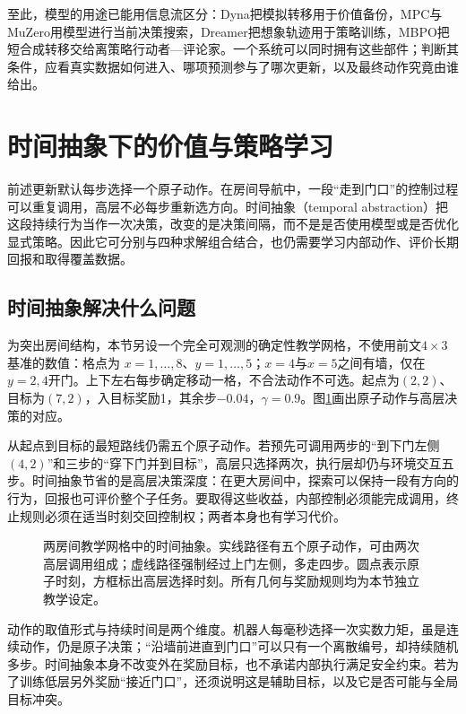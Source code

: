 至此，模型的用途已能用信息流区分：Dyna把模拟转移用于价值备份，MPC与MuZero用模型进行当前决策搜索，Dreamer把想象轨迹用于策略训练，MBPO把短合成转移交给离策略行动者—评论家。一个系统可以同时拥有这些部件；判断其条件，应看真实数据如何进入、哪项预测参与了哪次更新，以及最终动作究竟由谁给出。

\section{时间抽象下的价值与策略学习}
\label{sec:rl-learning-temporal-abstraction}

前述更新默认每步选择一个原子动作。在房间导航中，一段“走到门口”的控制过程可以重复调用，高层不必每步重新选方向。时间抽象（temporal abstraction）把这段持续行为当作一次决策，改变的是决策间隔，而不是是否使用模型或是否优化显式策略。因此它可分别与四种求解组合结合，也仍需要学习内部动作、评价长期回报和取得覆盖数据。

\subsection{时间抽象解决什么问题}
\label{sec:rl-learning-temporal-purpose}

为突出房间结构，本节另设一个完全可观测的确定性教学网格，不使用前文$4\times3$基准的数值：格点为
$x=1,\ldots,8$、$y=1,\ldots,5$；$x=4$与$x=5$之间有墙，仅在$y=2,4$开门。上下左右每步确定移动一格，不合法动作不可选。起点为$(2,2)$、目标为$(7,2)$，入目标奖励1，其余步$-0.04$，$\gamma=0.9$。图\ref{fig:rl-learning-options-rooms}画出原子动作与高层决策的对应。

从起点到目标的最短路线仍需五个原子动作。若预先可调用两步的“到下门左侧$(4,2)$”和三步的“穿下门并到目标”，高层只选择两次，执行层却仍与环境交互五步。时间抽象节省的是高层决策深度：在更大房间中，探索可以保持一段有方向的行为，回报也可评价整个子任务。要取得这些收益，内部控制必须能完成调用，终止规则必须在适当时刻交回控制权；两者本身也有学习代价。

\begin{figure}[t]
  \centering
  
  \caption{两房间教学网格中的时间抽象。实线路径有五个原子动作，可由两次高层调用组成；虚线路径强制经过上门左侧，多走四步。圆点表示原子时刻，方框标出高层选择时刻。所有几何与奖励规则均为本节独立教学设定。}
  \label{fig:rl-learning-options-rooms}
\end{figure}

动作的取值形式与持续时间是两个维度。机器人每毫秒选择一次实数力矩，虽是连续动作，仍是原子决策；“沿墙前进直到门口”可以只有一个离散编号，却持续随机多步。时间抽象本身不改变外在奖励目标，也不承诺内部执行满足安全约束。若为了训练低层另外奖励“接近门口”，还须说明这是辅助目标，以及它是否可能与全局目标冲突。

